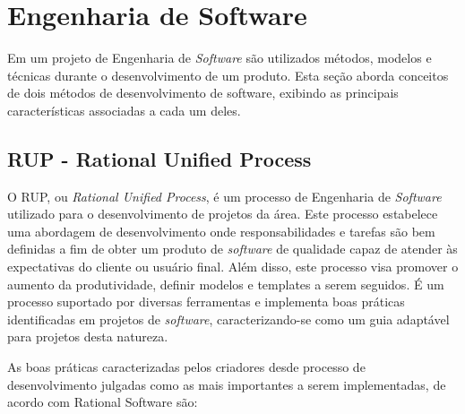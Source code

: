 \section{Engenharia de Software}
Em um projeto de Engenharia de \textit{Software} são utilizados métodos, modelos e técnicas durante o desenvolvimento de um produto. Esta seção aborda conceitos de dois métodos de desenvolvimento de software, exibindo as principais características associadas a cada um deles.

\subsection{RUP - Rational Unified Process}

O RUP, ou \textit{Rational Unified Process}, é um processo de Engenharia de \textit{Software} utilizado para o desenvolvimento de projetos da área. Este processo estabelece uma abordagem de desenvolvimento onde responsabilidades e tarefas são bem definidas a fim de obter um produto de \textit{software} de qualidade capaz de atender às expectativas do cliente ou usuário final. Além disso, este processo visa promover o aumento da produtividade, definir modelos e templates a serem seguidos. É um processo suportado por diversas ferramentas e implementa boas práticas identificadas em projetos de \textit{software}, caracterizando-se como um guia adaptável para projetos desta natureza\cite{rational_software_rational_1998}.

As boas práticas caracterizadas pelos criadores desde processo de desenvolvimento julgadas como as mais importantes a serem implementadas, de acordo com Rational Software \cite{rational_software_rational_1998} são:

